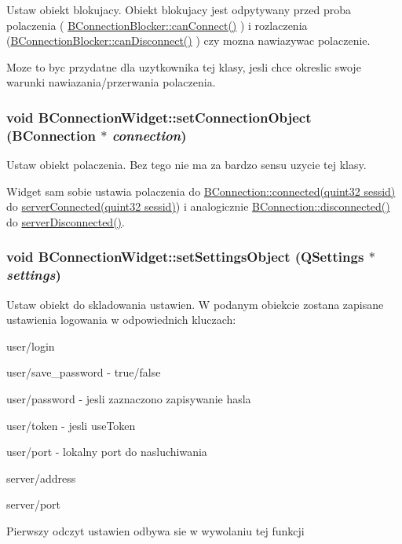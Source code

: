 Ustaw obiekt blokujacy. Obiekt blokujacy jest odpytywany przed proba polaczenia ( \hyperlink{class_b_connection_blocker_a2ebcdef0e5570c7331036dd5b6ba4448}{BConnectionBlocker::canConnect()} ) i rozlaczenia (\hyperlink{class_b_connection_blocker_a81e8782c93ac1943a7e19b4ed7ced792}{BConnectionBlocker::canDisconnect()} ) czy mozna nawiazywac polaczenie.

Moze to byc przydatne dla uzytkownika tej klasy, jesli chce okreslic swoje warunki nawiazania/przerwania polaczenia. \hypertarget{class_b_connection_widget_a476033357eea69f9ef4a7f4235a97556}{
\subsubsection[{setConnectionObject}]{\setlength{\rightskip}{0pt plus 5cm}void BConnectionWidget::setConnectionObject ({\bf BConnection} $\ast$ {\em connection})}}
\label{class_b_connection_widget_a476033357eea69f9ef4a7f4235a97556}


Ustaw obiekt polaczenia. Bez tego nie ma za bardzo sensu uzycie tej klasy.

Widget sam sobie ustawia polaczenia do \hyperlink{class_b_connection_a90dca3f0343427e31bb4544a8accf56d}{BConnection::connected(quint32 sessid)} do \hyperlink{class_b_connection_widget_a7c9d3a266939c6719fe198f9b3d67636}{serverConnected(quint32 sessid)}) i analogicznie \hyperlink{class_b_connection_a20fa85863f4cb396d3141e01d4928fd4}{BConnection::disconnected()} do \hyperlink{class_b_connection_widget_a159829b06e46c68a354ec999d4b15b61}{serverDisconnected()}. \hypertarget{class_b_connection_widget_a45070066f5da8af537f422d8b37c7d6e}{
\subsubsection[{setSettingsObject}]{\setlength{\rightskip}{0pt plus 5cm}void BConnectionWidget::setSettingsObject (QSettings $\ast$ {\em settings})}}
\label{class_b_connection_widget_a45070066f5da8af537f422d8b37c7d6e}


Ustaw obiekt do skladowania ustawien. W podanym obiekcie zostana zapisane ustawienia logowania w odpowiednich kluczach: \begin{DoxyItemize}
\item user/login \item user/save\_\-password -\/ true/false \item user/password -\/ jesli zaznaczono zapisywanie hasla \item user/token -\/ jesli useToken \item user/port -\/ lokalny port do nasluchiwania \item server/address \item server/port\end{DoxyItemize}
Pierwszy odczyt ustawien odbywa sie w wywolaniu tej funkcji

